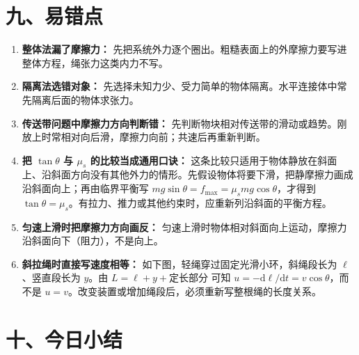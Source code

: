 \section*{九、易错点}

\begin{mistakebox}
\begin{enumerate}
  \item \textbf{整体法漏了摩擦力：} 先把系统外力逐个圈出。粗糙表面上的外摩擦力要写进整体方程，绳张力这类内力不写。

  \item \textbf{隔离法选错对象：} 先选择未知力少、受力简单的物体隔离。水平连接体中常先隔离后面的物体求张力。

  \item \textbf{传送带问题中摩擦力方向判断错：} 先判断物块相对传送带的滑动或趋势。刚放上时常相对向后滑，摩擦力向前；共速后再重新判断。

  \item \textbf{把 $\tan\theta$ 与 $\mu_s$ 的比较当成通用口诀：} 这条比较只适用于物体静放在斜面上、沿斜面方向没有其他外力的情形。先假设物体将要下滑，把静摩擦力画成沿斜面向上；再由临界平衡写 $mg\sin\theta=f_{\max}=\mu_smg\cos\theta$，才得到 $\tan\theta=\mu_s$。有拉力、推力或其他约束时，应重新列沿斜面的平衡方程。

  \item \textbf{匀速上滑时把摩擦力方向画反：} 匀速上滑时物体相对斜面向上运动，摩擦力沿斜面向下（阻力），不是向上。

  \item \textbf{斜拉绳时直接写速度相等：} 如下图，轻绳穿过固定光滑小环，斜绳段长为 $\ell$、竖直段长为 $y$。由
  $L=\ell+y+\text{定长部分}$ 可知
  $u=-\mathrm d\ell/\mathrm dt=v\cos\theta$，而不是
  $u=v$。改变装置或增加绳段后，必须重新写整根绳的长度关系。
\end{enumerate}

\begin{center}


\label{fig:rope-velocity-mistake}
\end{center}
\end{mistakebox}

\section*{十、今日小结}

